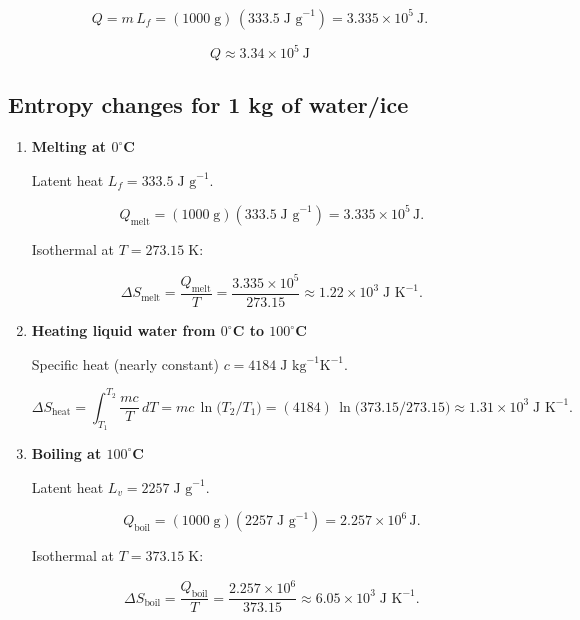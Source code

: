 \documentclass[12pt]{article}
\title{}
\author{Jerich Lee}
\date{\today}
\theoremstyle{definition} %
\theoremstyle{plain} %
\begin{document}
\maketitle
\[
  Q = m\,L_f
     = (1000\;\text{g})\,(333.5\;\text{J g}^{-1})
     = 3.335 \times 10^{5}\ \text{J}.
\]

\[
  \boxed{Q \approx 3.34 \times 10^{5}\ \text{J}}
\]

\subsection*{Entropy changes for 1 kg of water/ice}

\bigskip
\begin{enumerate}
\item \textbf{Melting at $0^{\circ}$C}

Latent heat \(L_f = 333.5\;\text{J g}^{-1}\).

\[
Q_{\text{melt}} = (1000\;\text{g})(333.5\;\text{J g}^{-1}) = 3.335\times10^{5}\,\text{J}.
\]

Isothermal at \(T = 273.15\;\text{K}\):

\[
\Delta S_{\text{melt}} = \frac{Q_{\text{melt}}}{T}
                       = \frac{3.335\times10^{5}}{273.15}
                       \approx \boxed{1.22\times10^{3}\;\text{J K}^{-1}}.
\]

\item \textbf{Heating liquid water from $0^{\circ}$C to $100^{\circ}$C}

Specific heat (nearly constant) \(c = 4184\;\text{J kg}^{-1}\text{K}^{-1}\).

\[
\Delta S_{\text{heat}}
   = \int_{T_1}^{T_2} \frac{mc}{T}\,dT
   = mc\,\ln\!\bigl(T_2/T_1\bigr)
   = (4184)\,\ln\!\bigl(373.15/273.15\bigr)
   \approx \boxed{1.31\times10^{3}\;\text{J K}^{-1}}.
\]

\item \textbf{Boiling at $100^{\circ}$C}

Latent heat \(L_v = 2257\;\text{J g}^{-1}\).

\[
Q_{\text{boil}} = (1000\;\text{g})(2257\;\text{J g}^{-1}) = 2.257\times10^{6}\,\text{J}.
\]

Isothermal at \(T = 373.15\;\text{K}\):

\[
\Delta S_{\text{boil}} = \frac{Q_{\text{boil}}}{T}
                       = \frac{2.257\times10^{6}}{373.15}
                       \approx \boxed{6.05\times10^{3}\;\text{J K}^{-1}}.
\]
\end{enumerate}
\end{document}
